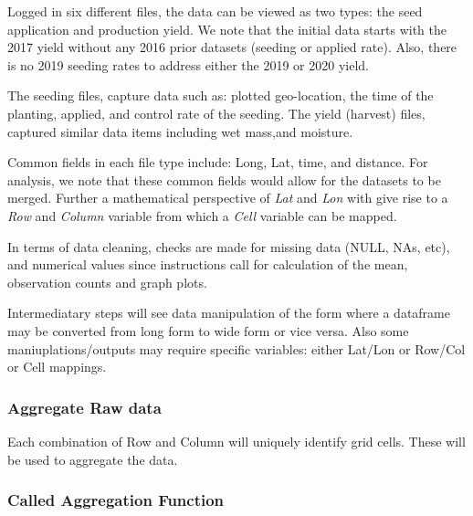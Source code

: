 \documentclass[
]{article}
\begin{document}
Logged in six different files, the data can be viewed as two types: the
seed application and production yield. We note that the initial data
starts with the 2017 yield without any 2016 prior datasets (seeding or
applied rate). Also, there is no 2019 seeding rates to address either
the 2019 or 2020 yield.

The seeding files, capture data such as: plotted geo-location, the time
of the planting, applied, and control rate of the seeding. The yield
(harvest) files, captured similar data items including wet mass,and
moisture.

Common fields in each file type include: Long, Lat, time, and distance.
For analysis, we note that these common fields would allow for the
datasets to be merged. Further a mathematical perspective of \emph{Lat}
and \emph{Lon} with give rise to a \emph{Row} and \emph{Column} variable
from which a \emph{Cell} variable can be mapped.

In terms of data cleaning, checks are made for missing data (NULL, NAs,
etc), and numerical values since instructions call for calculation of
the mean, observation counts and graph plots.

Intermediatary steps will see data manipulation of the form where a
dataframe may be converted from long form to wide form or vice versa.
Also some maniuplations/outputs may require specific variables: either
Lat/Lon or Row/Col or Cell mappings.

\subsubsection{Aggregate Raw data}\label{aggregate-raw-data}

Each combination of Row and Column will uniquely identify grid cells.
These will be used to aggregate the data.

\subsubsection{Called Aggregation
Function}\label{called-aggregation-function}
\end{document}
